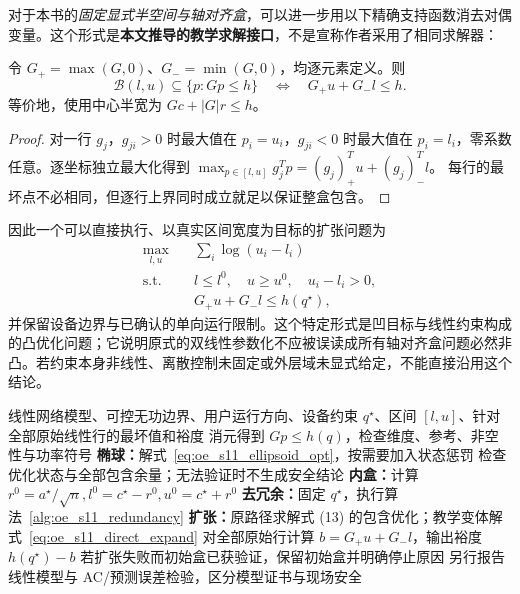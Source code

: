 对于本书的\emph{固定显式半空间与轴对齐盒}，可以进一步用以下精确支持函数消去对偶变量。这个形式是\textbf{本文推导的教学求解接口}，不是宣称作者采用了相同求解器：
\begin{proposition}[整盒线性约束的精确证书]
令 $G_+=\max(G,0)$、$G_-=\min(G,0)$，均逐元素定义。则
\begin{equation}
 \mathcal B(l,u)\subseteq\{p:Gp\le h\}
 \quad\Longleftrightarrow\quad
 G_+u+G_-l\le h.
 \label{eq:oe_s11_box_exact}
\end{equation}
等价地，使用中心半宽为 $Gc+|G|r\le h$。
\end{proposition}
\begin{proof}
对一行 $g_j$，$g_{ji}>0$ 时最大值在 $p_i=u_i$，$g_{ji}<0$ 时最大值在 $p_i=l_i$，零系数任意。逐坐标独立最大化得到
$\max_{p\in[l,u]}g_j^Tp=(g_j)_+^Tu+(g_j)_-^Tl$。
每行的最坏点不必相同，但逐行上界同时成立就足以保证整盒包含。
\end{proof}

因此一个可以直接执行、以真实区间宽度为目标的扩张问题为
\begin{equation}
 \begin{aligned}
 \max_{l,u}\quad &\sum_i\log(u_i-l_i)\\
 \text{s.t.}\quad &l\le l^0,\quad u\ge u^0,\quad u_i-l_i>0,\\
 &G_+u+G_-l\le h(q^\star),
 \end{aligned}
 \label{eq:oe_s11_direct_expand}
\end{equation}
并保留设备边界与已确认的单向运行限制。这个特定形式是凹目标与线性约束构成的凸优化问题；它说明原式的双线性参数化不应被误读成所有轴对齐盒问题必然非凸。若约束本身非线性、离散控制未固定或外层域未显式给定，不能直接沿用这个结论。

\begin{algorithm}[tbp]
\caption{S11 的四步教学算法：原方法主线与显式盒求解变体}
\label{alg:oe_s11_all}
\begin{algorithmic}[1]
\Require 线性网络模型、可控无功边界、用户运行方向、设备约束
\Ensure $q^\star$、区间 $[l,u]$、针对全部原始线性行的最坏值和裕度
\State 消元得到 $Gp\le h(q)$，检查维度、参考、非空性与功率符号
\State \textbf{椭球：}解式~\eqref{eq:oe_s11_ellipsoid_opt}，按需要加入状态惩罚
\State 检查优化状态与全部包含余量；无法验证时不生成安全结论
\State \textbf{内盒：}计算 $r^0=a^\star/\sqrt n,l^0=c^\star-r^0,u^0=c^\star+r^0$
\State \textbf{去冗余：}固定 $q^\star$，执行算法~\ref{alg:oe_s11_redundancy}
\State \textbf{扩张：}原路径求解式 (13) 的包含优化；教学变体解式~\eqref{eq:oe_s11_direct_expand}
\State 对全部原始行计算 $b=G_+u+G_-l$，输出裕度 $h(q^\star)-b$
\State 若扩张失败而初始盒已获验证，保留初始盒并明确停止原因
\State 另行报告线性模型与 AC/预测误差检验，区分模型证书与现场安全
\end{algorithmic}
\end{algorithm}

